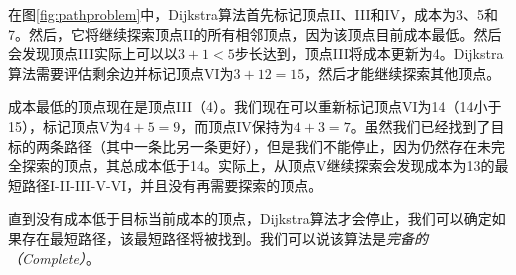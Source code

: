 
在图\ref{fig:pathproblem}中，Dijkstra算法首先标记顶点II、III和IV，成本为3、5和7。然后，它将继续探索顶点II的所有相邻顶点，因为该顶点目前成本最低。然后会发现顶点III实际上可以以$3 + 1 <5$步长达到，顶点III将成本更新为4。Dijkstra算法需要评估剩余边并标记顶点VI为$3 + 12 = 15$，然后才能继续探索其他顶点。


成本最低的顶点现在是顶点III（4）。我们现在可以重新标记顶点VI为14（14小于15），标记顶点V为$4+5=9$，而顶点IV保持为$4+3=7$。虽然我们已经找到了目标的两条路径（其中一条比另一条更好），但是我们不能停止，因为仍然存在未完全探索的顶点，其总成本低于14。实际上，从顶点V继续探索会发现成本为13的最短路径I-II-III-V-VI，并且没有再需要探索的顶点。


直到没有成本低于目标当前成本的顶点，Dijkstra算法才会停止，我们可以确定如果存在最短路径，该最短路径将被找到。我们可以说该算法是\emph{完备的（Complete）}。


